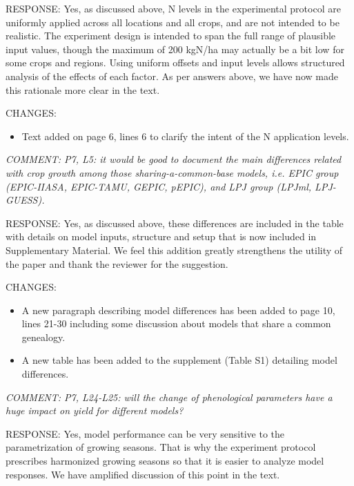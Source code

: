 \documentclass[gmd, manuscript]{copernicus} %
\begin{document}
RESPONSE: Yes, as discussed above, N levels in the experimental protocol are uniformly applied across all locations and all crops, and are not intended to be realistic. The experiment design is intended to span the full range of plausible input values, though the maximum of 200 kgN/ha may actually be a bit low for some crops and regions. Using uniform offsets and input levels allows structured analysis of the effects of each factor. As per answers above, we have now made this rationale more clear in the text.
\smallskip

CHANGES:
\begin{itemize}
    \item Text added on page 6, lines 6 to clarify the intent of the N application levels.
\end{itemize}

\smallskip

\textcolor{dark-gray}{\textit{COMMENT: P7, L5: it would be good to document the main differences related with crop growth among those sharing-a-common-base models, i.e. EPIC group (EPIC-IIASA, EPIC-TAMU, GEPIC, pEPIC), and LPJ group (LPJml, LPJ-GUESS).}}

RESPONSE: Yes, as discussed above, these differences are included in the table with details on model inputs, structure and setup that is now included in Supplementary Material. We feel this addition greatly strengthens the utility of the paper and thank the reviewer for the suggestion.
\smallskip

CHANGES:
\begin{itemize}
    \item A new paragraph describing model differences has been added to page 10, lines 21-30 including some discussion about models that share a common genealogy.
    \item A new table has been added to the supplement (Table S1) detailing model differences.
\end{itemize}

\smallskip

\textcolor{dark-gray}{\textit{COMMENT: P7, L24-L25: will the change of phenological parameters have a huge impact on yield for different models?}}

RESPONSE: Yes, model performance can be very sensitive to the parametrization of growing seasons. That is why the experiment protocol prescribes harmonized growing seasons so that it is easier to analyze model responses. We have amplified discussion of this point in the text.
\smallskip
\end{document}
